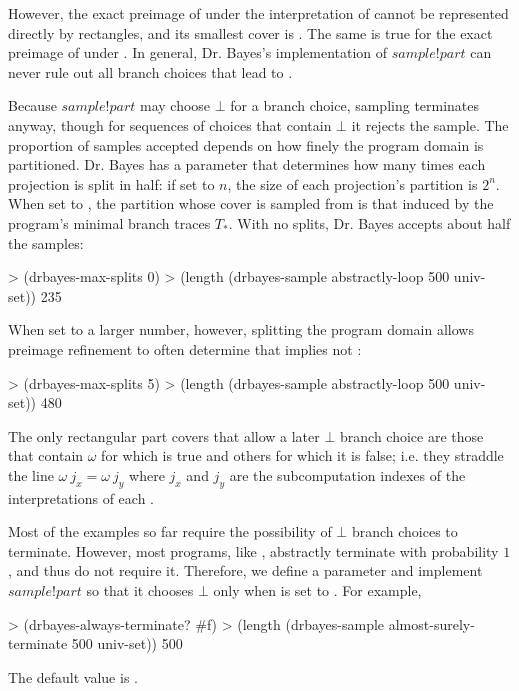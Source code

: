 However, the exact preimage of  under the interpretation of  cannot be represented directly by rectangles, and its smallest cover is .
The same is true for the exact preimage of  under .
In general, Dr. Bayes's implementation of $sample!part$ can never rule out all branch choices that lead to .

Because $sample!part$ may choose $\bot$ for a branch choice, sampling terminates anyway, though for sequences of choices that contain $\bot$ it rejects the sample.
The proportion of samples accepted depends on how finely the program domain is partitioned.
Dr. Bayes has a parameter  that determines how many times each projection is split in half: if set to $n$, the size of each projection's partition is $2^n$.
When set to , the partition whose cover is sampled from is that induced by the program's minimal branch traces $T_*$.
With no splits, Dr. Bayes accepts about half the samples:
\begin{center}\singlespacing
\begin{schemedisplay}
> (drbayes-max-splits 0)
> (length (drbayes-sample abstractly-loop 500 univ-set))
235
\end{schemedisplay}
\end{center}
When set to a larger number, however, splitting the program domain allows preimage refinement to often determine that  implies not :
\begin{center}\singlespacing
\begin{schemedisplay}
> (drbayes-max-splits 5)
> (length (drbayes-sample abstractly-loop 500 univ-set))
480
\end{schemedisplay}
\end{center}
The only rectangular part covers that allow a later $\bot$ branch choice are those that contain $\omega$ for which  is true and others for which it is false; i.e. they straddle the line $\omega~j_x = \omega~j_y$ where $j_x$ and $j_y$ are the subcomputation indexes of the interpretations of each .

Most of the examples so far require the possibility of $\bot$ branch choices to terminate.
However, most programs, like , abstractly terminate with probability $1$, and thus do not require it.
Therefore, we define a parameter  and implement $sample!part$ so that it chooses $\bot$ only when  is set to .
For example,
\begin{center}\singlespacing
\begin{schemedisplay}
> (drbayes-always-terminate? #f)
> (length (drbayes-sample almost-surely-terminate 500 univ-set))
500
\end{schemedisplay}
\end{center}
The default value is .

